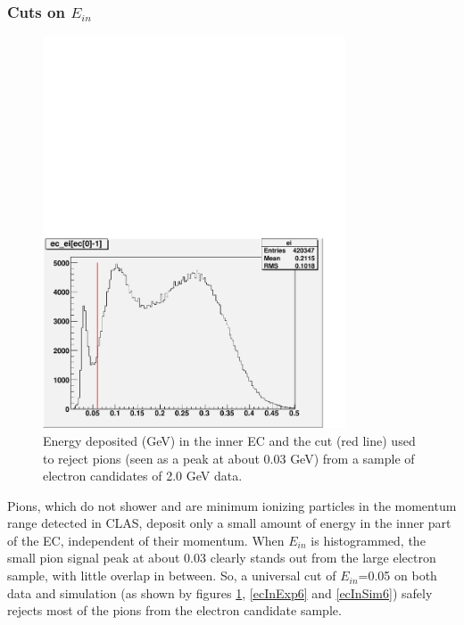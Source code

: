 \subsubsection{Cuts on $E_{in}$}
\begin{figure}[h] %
\centering
\leavevmode \includegraphics[width=0.8\textwidth]{figuresEG4/FigCuts/ec_eiCutFrmRtPrmtClasEb2.pdf}  %
\caption[EC inner energy cut (2.0 GeV)]{Energy deposited (GeV) in the inner EC and the cut (red line) used to reject pions (seen as a peak at about 0.03 GeV) from a sample of electron candidates of 2.0 GeV data.}
\label{ecInExp1}
\end{figure}

Pions, which do not shower and are minimum ionizing particles in the momentum range detected in CLAS, deposit only a small amount of energy in the inner part of the EC, %
independent of their momentum. When $E_{in}$ is histogrammed, the small pion signal peak at about 0.03 clearly stands out from the large electron sample, with little overlap in between. So, a universal cut of $E_{in}$=0.05 on both data and simulation (as shown by figures \ref{ecInExp1}, \ref{ecInExp6} and \ref{ecInSim6}) safely rejects most of the pions from the electron candidate sample. 


